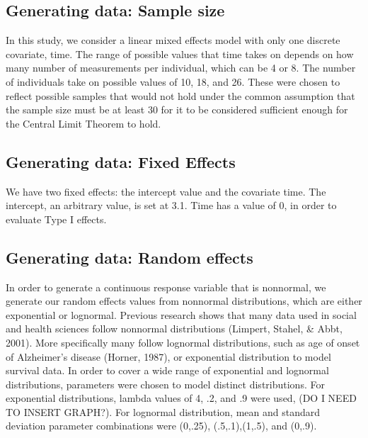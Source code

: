 \documentclass[12pt, twoside]{amherstthesis}
\begin{document}
\hypertarget{generating-data-sample-size}{%
\subsection{Generating data: Sample size}\label{generating-data-sample-size}}

In this study, we consider a linear mixed effects model with only one discrete covariate, time. The range of possible values that time takes on depends on how many number of measurements per individual, which can be 4 or 8. The number of individuals take on possible values of 10, 18, and 26. These were chosen to reflect possible samples that would not hold under the common assumption that the sample size must be at least 30 for it to be considered sufficient enough for the Central Limit Theorem to hold.

\hypertarget{generating-data-fixed-effects}{%
\subsection{Generating data: Fixed Effects}\label{generating-data-fixed-effects}}

We have two fixed effects: the intercept value and the covariate time. The intercept, an arbitrary value, is set at 3.1. Time has a value of 0, in order to evaluate Type I effects.

\hypertarget{generating-data-random-effects}{%
\subsection{Generating data: Random effects}\label{generating-data-random-effects}}

In order to generate a continuous response variable that is nonnormal, we generate our random effects values from nonnormal distributions, which are either exponential or lognormal. Previous research shows that many data used in social and health sciences follow nonnormal distributions (Limpert, Stahel, \& Abbt, 2001). More specifically many follow lognormal distributions, such as age of onset of Alzheimer's disease (Horner, 1987), or exponential distribution to model survival data. In order to cover a wide range of exponential and lognormal distributions, parameters were chosen to model distinct distributions. For exponential distributions, lambda values of 4, .2, and .9 were used, (DO I NEED TO INSERT GRAPH?). For lognormal distribution, mean and standard deviation parameter combinations were (0,.25), (.5,.1),(1,.5), and (0,.9).
\end{document}
